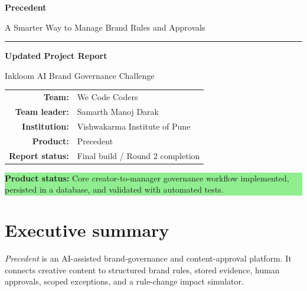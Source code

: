 \documentclass[11pt,a4paper]{article}
\newcommand{\product}{\textit{Precedent}}
\begin{document}
\begin{titlepage}
\thispagestyle{empty}
\vspace*{1.0cm}
\begin{center}
  {\Huge\bfseries\color{precedentgreen} Precedent\par}
  \vspace{0.25cm}
  {\Large\color{darkink} A Smarter Way to Manage Brand Rules and Approvals\par}
  \vspace{1.0cm}
  \rule{0.78\textwidth}{1pt}
  \vspace{0.65cm}

  {\Large\bfseries Updated Project Report\par}
  \vspace{0.35cm}
  {\large Inkloom AI Brand Governance Challenge\par}
  \vspace{1.2cm}

  \begin{tabular}{rl}
    \textbf{Team:} & We Code Coders\\
    \textbf{Team leader:} & Samarth Manoj Darak\\
    \textbf{Institution:} & Vishwakarma Institute of Pune\\
    \textbf{Product:} & Precedent\\
    \textbf{Report status:} & Final build / Round 2 completion\\
  \end{tabular}

  \vfill
  \begin{minipage}{0.78\textwidth}
  \centering
  \colorbox{lightgreen}{\parbox{0.92\linewidth}{
    \centering
    \textbf{Product status:} Core creator-to-manager governance workflow
    implemented, persisted in a database, and validated with automated tests.
  }}
  \end{minipage}
\end{center}
\end{titlepage}

\tableofcontents
\newpage

\section{Executive summary}

\product{} is an AI-assisted brand-governance and content-approval platform. It connects
creative content to structured brand rules, stored evidence, human approvals, scoped
exceptions, and a rule-change impact simulator.
\end{document}
